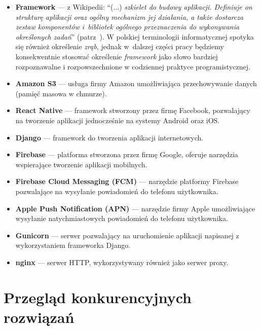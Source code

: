 \documentclass[licencjacka]{pracamgr}
\begin{document}
\begin{itemize}
\setlength\itemsep{-0.2em}

\item \textbf{Framework} --- z Wikipedii: ``(...) \textit{szkielet do budowy aplikacji. Definiuje on strukturę aplikacji oraz ogólny mechanizm jej działania, a także dostarcza zestaw komponentów i~bibliotek ogólnego przeznaczenia do wykonywania określonych zadań}'' (patrz~\cite{framework}). W polskiej terminologii informatycznej spotyka się również określenie \textit{zrąb}, jednak w~dalszej części pracy będziemy konsekwentnie stosować określenie \textit{framework} jako słowo bardziej rozpoznawalne i rozpowszechnione w codziennej praktyce programistycznej.

\item \textbf{Amazon S3} --- usługa firmy Amazon umożliwiająca przechowywanie danych (pamięć masowa w chmurze).

\item \textbf{React Native} --- framework stworzony przez firmę Facebook, pozwalający na tworzenie
aplikacji jednocześnie na systemy Android oraz iOS.

\item \textbf{Django} --- framework do tworzenia aplikacji internetowych.

\item \textbf{Firebase} --- platforma stworzona przez firmę Google, oferuje narzędzia wspierające tworzenie aplikacji mobilnych.

\item \textbf{Firebase Cloud Messaging (FCM)} --- narzędzie platformy Firebase pozwalające na wysyłanie powiadomień do telefonu użytkownika.

\item \textbf{Apple Push Notification (APN)} --- narzędzie firmy Apple umożliwiające wysyłanie natychmiastowych powiadomień do telefonu użytkownika.

\item \textbf{Gunicorn} --- serwer pozwalający na uruchomienie aplikacji napisanej z wykorzystaniem frameworka Django.

\item \textbf{nginx} --- serwer HTTP, wykorzystywany również jako serwer proxy.


\end{itemize}

\chapter{Przegląd konkurencyjnych rozwiązań}\label{r:konkurencja}
\end{document}
